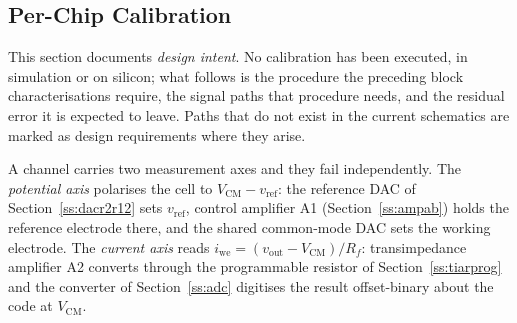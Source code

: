 %

\subsection{Per-Chip Calibration}\label{ss:calibration}

This section documents \emph{design intent}. No calibration has been executed,
in simulation or on silicon; what follows is the procedure the preceding block
characterisations require, the signal paths that procedure needs, and the
residual error it is expected to leave. Paths that do not exist in the current
schematics are marked as design requirements where they arise.

A channel carries two measurement axes and they fail independently. The
\emph{potential axis} polarises the cell to \(V_{\mathrm{CM}} -
v_{\mathrm{ref}}\): the reference DAC of Section~\ref{ss:dacr2r12} sets
\(v_{\mathrm{ref}}\), control amplifier A1 (Section~\ref{ss:ampab}) holds the
reference electrode there, and the shared common-mode DAC sets the working
electrode. The \emph{current axis} reads \(i_{\mathrm{we}} = (v_{\mathrm{out}}
- V_{\mathrm{CM}})/R_f\): transimpedance amplifier A2 converts through the
programmable resistor of Section~\ref{ss:tiarprog} and the converter of
Section~\ref{ss:adc} digitises the result offset-binary about the code at
\(V_{\mathrm{CM}}\).

